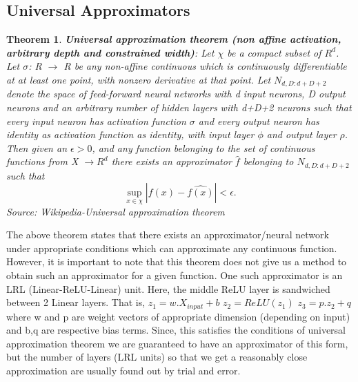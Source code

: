 \documentclass[11pt, twosides]{article}
\newcounter{lecnum}
\newtheorem{theorem}{Theorem}[lecnum]
\begin{document}
\subsection{Universal Approximators}
\begin{theorem}
\textbf{Universal approximation theorem (non affine activation, arbitrary depth and constrained width)}: Let $\chi$ be a compact subset of $R^{d}$. Let $\sigma$: R $\xrightarrow{}$ R be any non-affine continuous  which is continuously differentiable at at least one point, with nonzero derivative at that point. Let $N_{d,D:d+D+2}$ denote the space of feed-forward neural networks with d input neurons, D output neurons and an arbitrary number of hidden layers with d+D+2 neurons such that every input neuron has activation function $\sigma$ and every output neuron has identity as activation function as identity, with input layer $\phi$ and output layer $\rho$. Then given an $\epsilon>0$, and any function belonging to the set of continuous functions from X $\xrightarrow{}R^d$ there exists an approximator $\hat{f}$ belonging to $ N_{d,D:d+D+2}$ such that \[
\sup_{x \in \chi} |f(x)-\hat{f(x)}|<\epsilon
.\]
Source: Wikipedia-Universal approximation theorem

\end{theorem}
The above theorem states that there exists an approximator/neural network under appropriate conditions which can approximate any continuous function. However, it is important to note that this theorem does not give us a method to obtain such an approximator for a given function. One such approximator is an LRL (Linear-ReLU-Linear) unit.  
Here, the middle ReLU layer is sandwiched between 2 Linear layers.
That is, $z_1= w.X_{input}+b$ \newline
$z_2= ReLU(z_1)$ \newline
$z_3= p.z_2+q$ where w and p are weight vectors of appropriate dimension (depending on input) and b,q are respective bias terms.
Since, this satisfies the conditions of universal approximation theorem we are guaranteed to have an approximator of this form, but the number of layers (LRL units) so that we get a reasonably close approximation are usually found out by trial and error.

\end{document}
